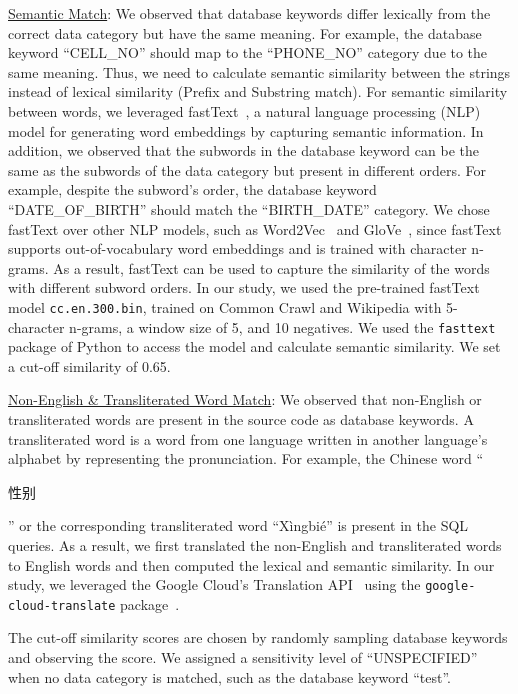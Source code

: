 \uline{Semantic Match}: We observed that database keywords differ lexically from the correct data category but have the same meaning. For example, the database keyword ``CELL\_NO'' should map to the ``PHONE\_NO'' category due to the same meaning. Thus, we need to calculate semantic similarity between the strings instead of lexical similarity (Prefix and Substring match). For semantic similarity between words, we leveraged fastText~\cite{bojanowski2017enriching}, a natural language processing (NLP) model for generating word embeddings by capturing semantic information. In addition, we observed that the subwords in the database keyword can be the same as the subwords of the data category but present in different orders. For example, despite the subword's order, the database keyword ``DATE\_OF\_BIRTH'' should match the ``BIRTH\_DATE'' category. We chose fastText over other NLP models, such as Word2Vec~\cite{mikolov2013efficient} and GloVe~\cite{pennington2014glove}, since fastText supports out-of-vocabulary word embeddings and is trained with character n-grams. As a result, fastText can be used to capture the similarity of the words with different subword orders. In our study, we used the pre-trained fastText model \texttt{cc.en.300.bin}, trained on Common Crawl and Wikipedia with 5-character n-grams, a window size of 5, and 10 negatives. We used the \texttt{fasttext}~\cite{fasttext} package of Python to access the model and calculate semantic similarity. We set a cut-off similarity of 0.65.

\uline{Non-English \& Transliterated Word Match}: We observed that non-English or transliterated words are present in the source code as database keywords. A transliterated word is a word from one language written in another language's alphabet by representing the pronunciation. For example, the Chinese word ``\begin{CJK}{UTF8}{gbsn}性别\end{CJK}'' or the corresponding transliterated word ``Xìngbié'' is present in the SQL queries. As a result, we first translated the non-English and transliterated words to English words and then computed the lexical and semantic similarity. In our study, we leveraged the Google Cloud's Translation API~\cite{google-cloud-translation-api} using the \texttt{google-cloud-translate} package~\cite{google-cloud-translate}.    

The cut-off similarity scores are chosen by randomly sampling database keywords and observing the score. We assigned a sensitivity level of ``UNSPECIFIED'' when no data category is matched, such as the database keyword ``test''.

